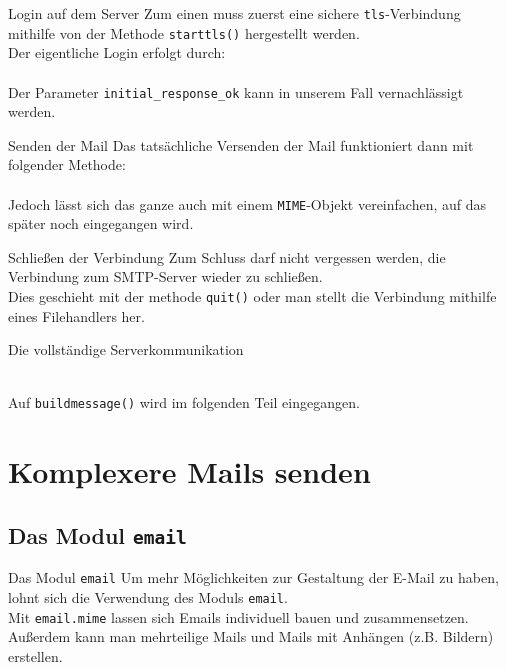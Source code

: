 \begin{frame}[fragile]{Login auf dem Server}
	Zum einen muss zuerst eine sichere \texttt{tls}-Verbindung mithilfe von der Methode \texttt{starttls()} hergestellt werden.\\[.25cm]
	Der eigentliche Login erfolgt durch:\\
	
	\ \\[.25cm]
	Der Parameter \texttt{initial\_response\_ok} kann in unserem Fall vernachlässigt werden.
\end{frame}

\begin{frame}[fragile]{Senden der Mail}
	Das tatsächliche Versenden der Mail funktioniert dann mit folgender Methode:\\[.25cm]
	
	\ \\[.25cm]
	Jedoch l\"asst sich das ganze auch mit einem \texttt{MIME}-Objekt vereinfachen, auf das später noch eingegangen wird.
\end{frame}

\begin{frame}{Schließen der Verbindung}
	Zum Schluss darf nicht vergessen werden, die Verbindung zum SMTP-Server wieder zu schließen.\\
	Dies geschieht mit der methode \texttt{quit()} oder man stellt die Verbindung mithilfe eines Filehandlers her.
\end{frame}

\begin{frame}[fragile]{Die vollst\"andige Serverkommunikation}
	
	\ \\[1cm]
	Auf \texttt{buildmessage()} wird im folgenden Teil eingegangen.
\end{frame}

\section{Komplexere Mails senden}
\subsection{Das Modul \texttt{email}}
\begin{frame}[fragile]{Das Modul \texttt{email}}
	Um mehr Möglichkeiten zur Gestaltung der E-Mail zu haben, lohnt sich die Verwendung des Moduls \texttt{email}.\\[.5cm]
	Mit \texttt{email.mime} lassen sich Emails individuell bauen und zusammensetzen. Außerdem kann man mehrteilige Mails und Mails mit Anhängen (z.B. Bildern) erstellen.
\end{frame}

